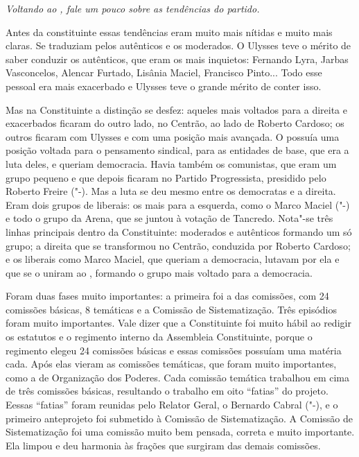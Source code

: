 \medskip

\noindent\emph{Voltando ao , fale um pouco sobre as tendências do partido.}

Antes da constituinte essas tendências eram muito mais
nítidas e muito mais claras. Se traduziam pelos autênticos e os
moderados. O Ulysses teve o mérito de saber conduzir os autênticos, que
eram os mais inquietos: Fernando Lyra, Jarbas Vasconcelos, Alencar
Furtado, Lisânia Maciel, Francisco Pinto... Todo esse pessoal era mais
exacerbado e Ulysses teve o grande mérito de conter isso.

Mas na Constituinte a distinção se desfez: aqueles mais voltados para a
direita e exacerbados ficaram do outro lado, no Centrão, ao lado de
Roberto Cardoso; os outros ficaram com Ulysses e com uma posição mais
avançada. O  possuía uma posição voltada para o pensamento sindical,
para as entidades de base, que era a luta deles, e queriam democracia.
Havia também os comunistas, que eram um grupo pequeno e que depois
ficaram no Partido Progressista, presidido pelo Roberto Freire ("-).
Mas a luta se deu mesmo entre os democratas e a direita. Eram dois
grupos de liberais: os mais para a esquerda, como o Marco Maciel
("-) e todo o grupo da Arena, que se juntou à votação de Tancredo.
Nota"-se três linhas principais dentro da Constituinte: moderados e
autênticos formando um só grupo; a direita que se transformou no
Centrão, conduzida por Roberto Cardoso; e os liberais como Marco Maciel,
que queriam a democracia, lutavam por ela e que se o uniram ao ,
formando o grupo mais voltado para a democracia.

Foram duas fases muito importantes: a primeira foi a das comissões, com
24 comissões básicas, 8 temáticas e a Comissão de Sistematização. Três
episódios foram muito importantes. Vale dizer que a Constituinte foi
muito hábil ao redigir os estatutos e o regimento interno da Assembleia
Constituinte, porque o regimento elegeu 24 comissões básicas e essas
comissões possuíam uma matéria cada. Após elas vieram as comissões
temáticas, que foram muito importantes, como a de Organização dos
Poderes. Cada comissão temática trabalhou em cima de três comissões
básicas, resultando o trabalho em oito ``fatias'' do projeto. Eessas
``fatias'' foram reunidas pelo Relator Geral, o Bernardo Cabral
("-), e o primeiro anteprojeto foi submetido à Comissão de
Sistematização. A Comissão de Sistematização foi uma comissão muito bem
pensada, correta e muito importante. Ela limpou e deu harmonia às
frações que surgiram das demais comissões.

